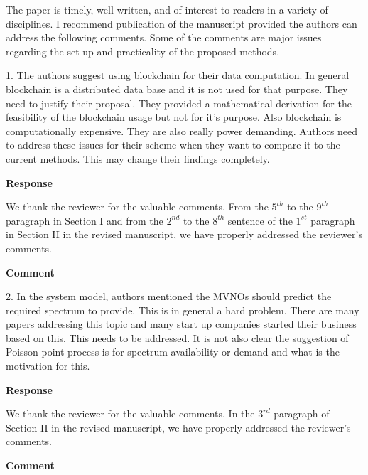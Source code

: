 \documentclass[12pt,draftcls, onecolumn]{IEEEtran}
\begin{document}
The paper is timely, well written, and of interest to readers in a variety of disciplines. I recommend publication of the manuscript provided the authors can address the following comments. Some of the comments are major issues regarding the set up and practicality of the proposed methods.
 
1. The authors suggest using blockchain for their data computation. In general blockchain is a distributed data base and it is not used for that purpose. They need to justify their proposal. They provided a mathematical derivation for the feasibility of the blockchain usage but not for it's purpose. Also blockchain is computationally expensive. They are also really power demanding. Authors need to address these issues for their scheme when they want to compare it to the current methods. This may change their findings completely.

\vspace{3mm} \noindent\textcolor[rgb]{0.00,0.00,1.00}{\textbf{Response}}
\vspace{2mm}

We thank the reviewer for the valuable comments. From the $ 5^{th} $ to the $ 9^{th} $ paragraph in Section I and from the $ 2^{nd} $ to the $ 8^{th} $ sentence of the $ 1^{st} $ paragraph in Section II in the revised manuscript, we have properly addressed the reviewer's comments.

\vspace{3mm}
\noindent\textcolor[rgb]{1.00,0.00,0.00}{\textbf{Comment}}
\vspace{3mm}

2. In the system model, authors mentioned the MVNOs should predict the required spectrum to provide. This is in general a hard problem. There are many papers addressing this topic and many start up companies started their business based on this. This needs to be addressed. It is not also clear the suggestion of Poisson point process is for spectrum availability or demand and what is the motivation for this.

\vspace{3mm} \noindent\textcolor[rgb]{0.00,0.00,1.00}{\textbf{Response}}
\vspace{2mm}

We thank the reviewer for the valuable comments. In the $ 3^{rd} $ paragraph of Section II in the revised manuscript, we have properly addressed the reviewer's comments.


\vspace{3mm}
\noindent\textcolor[rgb]{1.00,0.00,0.00}{\textbf{Comment}}
\vspace{3mm}
\end{document}

